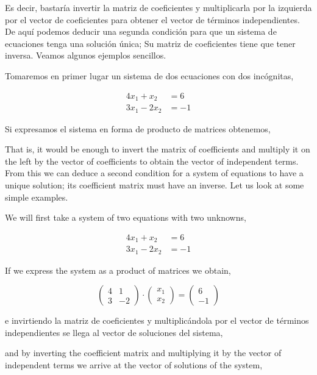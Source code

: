 \begin{paracol}{2}
Es decir, bastaría invertir la matriz de coeficientes y multiplicarla por la izquierda por el vector de coeficientes para obtener el vector de  términos independientes. De aquí podemos deducir una segunda condición para que un sistema de ecuaciones tenga una solución única; Su matriz de coeficientes tiene que tener inversa. Veamos algunos ejemplos sencillos.

Tomaremos en primer lugar un sistema de dos ecuaciones con dos incógnitas,

\begin{align*}
4x_1+x_2&=6\\
3x_1-2x_2&=-1
\end{align*}

Si expresamos el sistema en forma de producto de matrices obtenemos,

\switchcolumn

That is, it would be enough to invert the matrix of coefficients and multiply it on the left by the vector of coefficients to obtain the vector of independent terms. From this we can deduce a second condition for a system of equations to have a unique solution; its coefficient matrix must have an inverse. Let us look at some simple examples.

We will first take a system of two equations with two unknowns,

\begin{align*}
4x_1+x_2&=6 \\
3x_1-2x_2&=-1
\end{align*}

If we express the system as a product of matrices we obtain,

\end{paracol}

\begin{equation*}
\begin{pmatrix}
4& 1\\
3& -2
\end{pmatrix} \cdot \begin{pmatrix}
x_1\\
x_2
\end{pmatrix}=\begin{pmatrix}
6\\
-1
\end{pmatrix}
\end{equation*}

\begin{paracol}{2}
e invirtiendo la matriz de coeficientes y multiplicándola por el vector de términos independientes se llega al vector de soluciones del sistema,

\switchcolumn
and by inverting the coefficient matrix and multiplying it by the vector of independent terms we arrive at the vector of solutions of the system,

\end{paracol}

